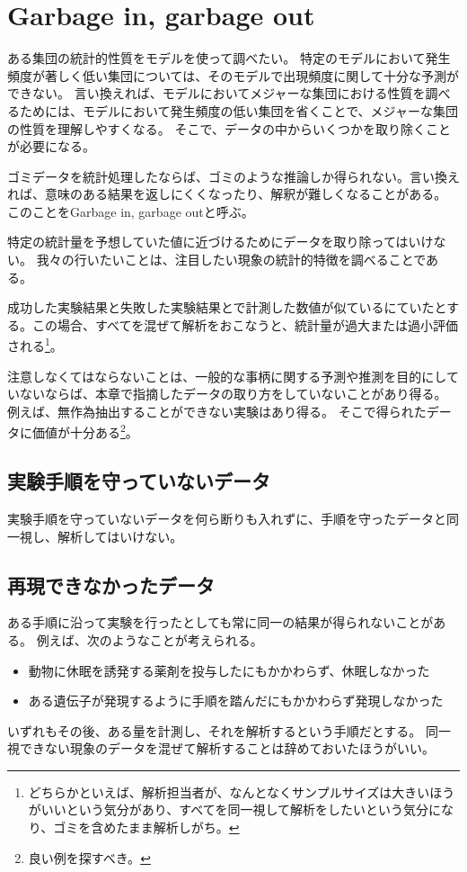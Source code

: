 \section{Garbage in, garbage out}

ある集団の統計的性質をモデルを使って調べたい。
特定のモデルにおいて発生頻度が著しく低い集団については、そのモデルで出現頻度に関して十分な予測ができない。
言い換えれば、モデルにおいてメジャーな集団における性質を調べるためには、モデルにおいて発生頻度の低い集団を省くことで、メジャーな集団の性質を理解しやすくなる。
そこで、データの中からいくつかを取り除くことが必要になる。


ゴミデータを統計処理したならば、ゴミのような推論しか得られない。言い換えれば、意味のある結果を返しにくくなったり、解釈が難しくなることがある。
このことをGarbage in, garbage outと呼ぶ。



特定の統計量を予想していた値に近づけるためにデータを取り除ってはいけない。
我々の行いたいことは、注目したい現象の統計的特徴を調べることである。

成功した実験結果と失敗した実験結果とで計測した数値が似ているにていたとする。この場合、すべてを混ぜて解析をおこなうと、統計量が過大または過小評価される\footnote{どちらかといえば、解析担当者が、なんとなくサンプルサイズは大きいほうがいいという気分があり、すべてを同一視して解析をしたいという気分になり、ゴミを含めたまま解析しがち。}。


注意しなくてはならないことは、一般的な事柄に関する予測や推測を目的にしていないならば、本章で指摘したデータの取り方をしていないことがあり得る。
例えば、無作為抽出することができない実験はあり得る。
そこで得られたデータに価値が十分ある\footnote{良い例を探すべき。}。%
\fi

\subsection{実験手順を守っていないデータ}
実験手順を守っていないデータを何ら断りも入れずに、手順を守ったデータと同一視し、解析してはいけない。

\subsection{再現できなかったデータ}
ある手順に沿って実験を行ったとしても常に同一の結果が得られないことがある。
例えば、次のようなことが考えられる。
\begin{itemize}
    \item 動物に休眠を誘発する薬剤を投与したにもかかわらず、休眠しなかった
    \item ある遺伝子が発現するように手順を踏んだにもかかわらず発現しなかった
\end{itemize}
いずれもその後、ある量を計測し、それを解析するという手順だとする。
同一視できない現象のデータを混ぜて解析することは辞めておいたほうがいい。

